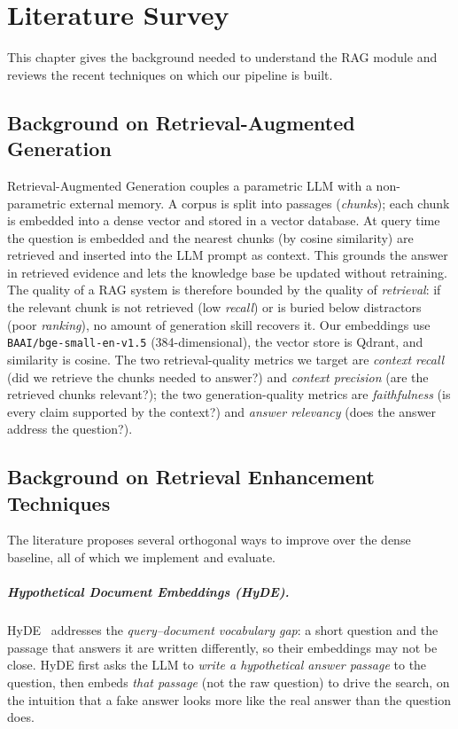 \documentclass[12pt,a4paper]{report}
\begin{document}
\chapter{Literature Survey}
This chapter gives the background needed to understand the RAG module and reviews
the recent techniques on which our pipeline is built.

\section{Background on Retrieval-Augmented Generation}
Retrieval-Augmented Generation couples a parametric LLM with a non-parametric
external memory. A corpus is split into passages (\emph{chunks}); each chunk is
embedded into a dense vector and stored in a vector database. At query time the
question is embedded and the nearest chunks (by cosine similarity) are retrieved
and inserted into the LLM prompt as context. This grounds the answer in retrieved
evidence and lets the knowledge base be updated without retraining. The quality of
a RAG system is therefore bounded by the quality of \emph{retrieval}: if the
relevant chunk is not retrieved (low \emph{recall}) or is buried below
distractors (poor \emph{ranking}), no amount of generation skill recovers it. Our
embeddings use \texttt{BAAI/bge-small-en-v1.5} (384-dimensional), the vector store
is Qdrant, and similarity is cosine. The two retrieval-quality metrics we target
are \emph{context recall} (did we retrieve the chunks needed to answer?) and
\emph{context precision} (are the retrieved chunks relevant?); the two
generation-quality metrics are \emph{faithfulness} (is every claim supported by
the context?) and \emph{answer relevancy} (does the answer address the question?).

\section{Background on Retrieval Enhancement Techniques}
The literature proposes several orthogonal ways to improve over the dense
baseline, all of which we implement and evaluate.

\paragraph{Hypothetical Document Embeddings (HyDE).}
HyDE~\cite{hyde} addresses the \emph{query--document vocabulary gap}: a short
question and the passage that answers it are written differently, so their
embeddings may not be close. HyDE first asks the LLM to \emph{write a hypothetical
answer passage} to the question, then embeds \emph{that passage} (not the raw
question) to drive the search, on the intuition that a fake answer looks more like
the real answer than the question does.
\end{document}
